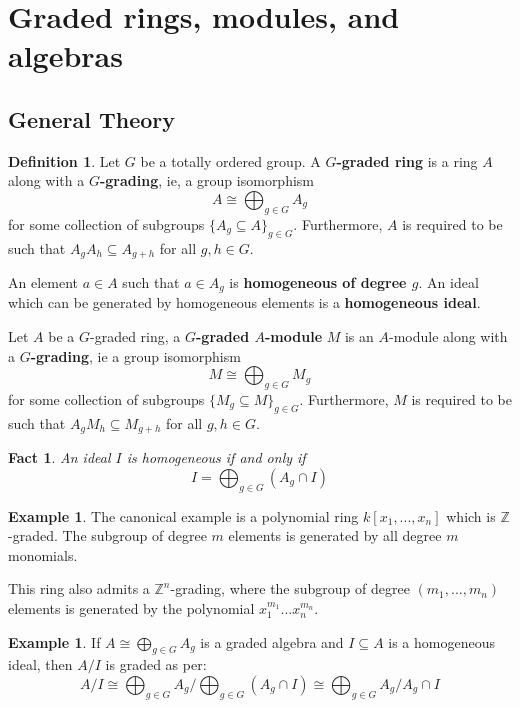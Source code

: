 \documentclass[12pt]{article}
\theoremstyle{plain}
\newtheorem{fact}[thm]{Fact}
\theoremstyle{definition}
\newtheorem{defn}[thm]{Definition} %
\newtheorem{example}[thm]{Example}
\newcommand{\bb}[1]{\mathbb{#1}}
\begin{document}
	\section{Graded rings, modules, and algebras}\label{Sec:Graded}
	\subsection{General Theory}
	\begin{defn}
		Let $G$ be a totally ordered group. A \textbf{$G$-graded ring} is a ring $A$ along with a \textbf{$G$-grading}, ie, a group isomorphism
		\begin{equation}
			A \cong \bigoplus_{g \in G}A_g
		\end{equation}
		for some collection of subgroups $\lbrace A_g \subseteq A \rbrace_{g \in G}$. Furthermore, $A$ is required to be such that $A_gA_h \subseteq A_{g + h}$ for all $g,h \in G$.
		
		An element $a \in A$ such that $a \in A_g$ is \textbf{homogeneous of degree $g$}. An ideal which can be generated by homogeneous elements is a \textbf{homogeneous ideal}.
		
		Let $A$ be a $G$-graded ring, a \textbf{$G$-graded $A$-module} $M$ is an $A$-module along with a \textbf{$G$-grading}, ie a group isomorphism
		\begin{equation}
			M \cong \bigoplus_{g \in G} M_g
		\end{equation}
		for some collection of subgroups $\lbrace M_g \subseteq M\rbrace_{g \in G}$. Furthermore, $M$ is required to be such that $A_gM_h \subseteq M_{g + h}$ for all $g,h \in G$.
	\end{defn}
	\begin{fact}
		An ideal $I$ is homogeneous if and only if
		\begin{equation}
			I = \bigoplus_{g \in G}(A_g \cap I)
		\end{equation}
	\end{fact}
	\begin{example}
		The canonical example is a polynomial ring $k[x_1,...,x_n]$ which is $\bb{Z}$-graded. The subgroup of degree $m$ elements is generated by all degree $m$ monomials.
		
		This ring also admits a $\bb{Z}^n$-grading, where the subgroup of degree $(m_1,...,m_n)$ elements is generated by the polynomial $x^{m_1}_1...x^{m_n}_n$.
	\end{example}
	\begin{example}\label{ex:quotient_of_homog_by_homog}
		If $A \cong \bigoplus_{g \in G}A_g$ is a graded algebra and $I \subseteq A$ is a homogeneous ideal, then $A/I$ is graded as per:
		\begin{equation}
			A/I \cong \bigoplus_{g \in G}A_g/\bigoplus_{g \in G}(A_g \cap I) \cong \bigoplus_{g \in G}A_g/A_g \cap I
		\end{equation}
	\end{example}
	
\end{document}
